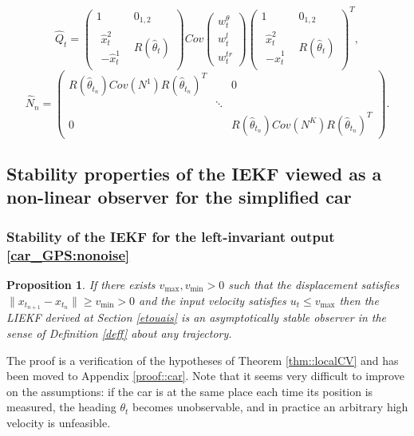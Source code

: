 \documentclass[a4paper,12pt,onecolumn]{article}
\newtheorem{prop}{Proposition}
\newcommand{\norm}[1]{\lVert#1\rVert}
\begin{document}
 \[
\hat{Q}_t = \begin{pmatrix}
1 & 0_{1,2} \\
\begin{matrix}
\hat{x}_t^2 \\
-\hat{x}_t^1
\end{matrix} & R(\hat{\theta}_t) 
\end{pmatrix} Cov \begin{pmatrix} w_t^\theta \\ w_t^l \\ w_t^{tr} \end{pmatrix} \begin{pmatrix}
1 & 0_{1,2} \\
\begin{matrix}
\hat{x}_t^2 \\
-\hat{x}_t^1
\end{matrix} & R(\hat{\theta}_t) 
\end{pmatrix}^T,
\]
\[
\hat{N}_n = \begin{pmatrix} R(\hat{\theta}_{t_n}) Cov (N^1) R(\hat{\theta}_{t_n})^T  &  & 0 \\  & \ddots &  \\
0 &  & R(\hat{\theta}_{t_n}) Cov ( N^K ) R(\hat{\theta}_{t_n})^T \end{pmatrix}.
\]


 \subsection{Stability properties of the IEKF viewed as a non-linear observer for the simplified car}
 
 \subsubsection{Stability of the IEKF for the left-invariant output \eqref{car_GPS:nonoise}}

\begin{prop}
\label{prop::car}
If  there exists $v_{\max},v_{\min}>0$ such that the displacement satisfies $\norm{x_{t_{n+1}}-x_{t_n}}\geq v_{\min}>0$ and the input velocity satisfies  $u_t \leq v_{\max}$ then the LIEKF derived at Section \ref{etouais} is an asymptotically stable observer in the sense of Definition \ref{deff} about \emph{any} trajectory.
\end{prop}

The proof is a verification of the hypotheses of Theorem \ref{thm::localCV} and  has been moved to Appendix \ref{proof::car}.  
Note that it seems very difficult to improve on the assumptions: if the car is at the same place each time its position is measured, the heading $\theta_t$ becomes unobservable, and in practice an arbitrary high velocity is unfeasible. 
\end{document}
